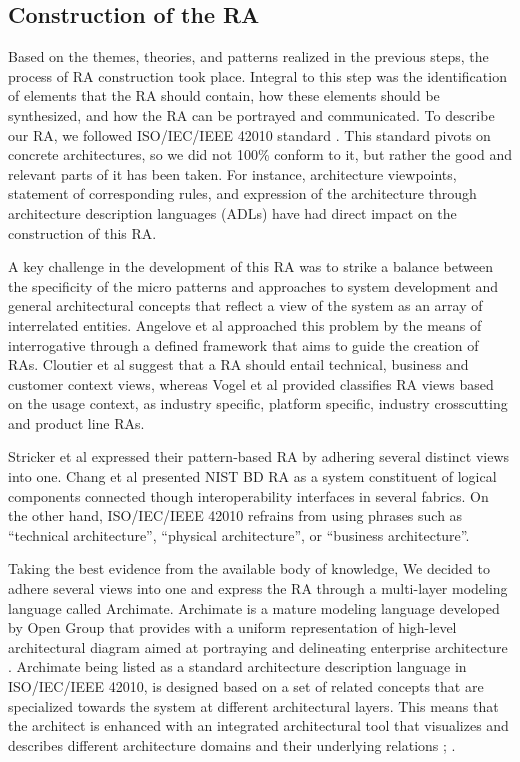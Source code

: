 \documentclass[review]{elsarticle}
\begin{document}
   
\subsection{Construction of the RA}

Based on the themes, theories, and patterns realized in the previous steps, the process of RA construction took place. Integral to this step was the identification of elements that the RA should contain, how these elements should be synthesized, and how the RA can be portrayed and communicated. To describe our RA, we followed ISO/IEC/IEEE 42010 standard \cite{ISO42010}. This standard pivots on concrete architectures, so we did not 100\% conform to it, but rather the good and relevant parts of it has been taken. For instance, architecture viewpoints, statement of corresponding rules, and expression of the architecture through architecture description languages (ADLs) have had direct impact on the construction of this RA.

A key challenge in the development of this RA was to strike a balance between the specificity of the micro patterns and approaches to system development and general architectural concepts that reflect a view of the system as an array of interrelated entities. Angelove et al \cite{angelov2012framework} approached this problem by the means of interrogative through a defined framework that aims to guide the creation of RAs.
Cloutier et al \cite{Cloutier} suggest that a RA should entail technical, business and customer context views, whereas Vogel et al \cite{vogel2009software} provided classifies RA views based on the usage context, as industry specific, platform specific, industry crosscutting and product line RAs.

Stricker et al \cite{Stricker} expressed their pattern-based RA by adhering several distinct views into one. Chang et al \cite{Chang} presented NIST BD RA as a system constituent of logical components connected though interoperability interfaces in several fabrics. On the other hand, ISO/IEC/IEEE 42010 refrains from using phrases such as “technical architecture”, “physical architecture”, or “business architecture”.

Taking the best evidence from the available body of knowledge, We decided to adhere several views into one and express the RA through a multi-layer modeling language called Archimate. Archimate is a mature modeling language developed by Open Group that provides with a uniform representation of high-level architectural diagram aimed at portraying and delineating enterprise architecture \cite{lankhorst2013language}. Archimate being listed as a standard architecture description language in ISO/IEC/IEEE 42010, is designed based on a set of related concepts that are specialized towards the system at different architectural layers. This means that the architect is enhanced with an integrated architectural tool that visualizes and describes different architecture domains and their underlying relations \cite{lankhorst2010anatomy}; \cite{engelsman2011extending}.
\end{document}
